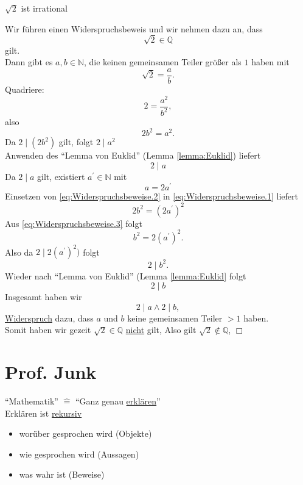\documentclass[a4paper, parskip = true, fleqn, headsepline = true]{scrartcl}
\DeclareRobustCommand{\qed}{%
	\ifmmode \tag*{$\Box$}%
	\else \leavevmode\unskip\penalty9999 \hbox{}\nobreak\hfill\quad\hbox{$\Box$}%
	\fi%
}
\begin{document}
\begin{subtheorem}
	\label{theorem:Sqrt2IstIrrational}
	$ \sqrt{2} $ ist irrational
\end{subtheorem}
\begin{subproof}
	Wir führen einen Widerspruchsbeweis und wir nehmen dazu an, dass
	\[ \sqrt{2} \in \mathbb{Q} \]
	gilt.\\
	Dann gibt es $ a, b \in \mathbb{N} $, die keinen gemeinsamen Teiler größer als $ 1 $ haben mit
	\[ \sqrt{2} = \frac{a}{b}. \]
	Quadriere:
	\[ 2 = \frac{a^2}{b^2}, \]
	also
	\begin{equation}
		\label{eq:Widerspruchsbeweise.1}
		2b^2 = a^2.
	\end{equation}
	Da $ 2 \mid ( 2b^2 ) $ gilt, folgt $ 2 \mid a^2 $\\
	Anwenden des ``Lemma von Euklid'' (Lemma \ref{lemma:Euklid}) liefert
	\[ 2 \mid a \]
	Da $ 2 \mid a $ gilt, existiert $ a^{\prime} \in \mathbb{N} $ mit
	\begin{equation}
		\label{eq:Widerspruchsbeweise.2}
		a = 2 a^{\prime}
	\end{equation}
	Einsetzen von \ref{eq:Widerspruchsbeweise.2} in \ref{eq:Widerspruchsbeweise.1} liefert
	\begin{equation}
		\label{eq:Widerspruchsbeweise.3}
		2b^2 = ( 2a^{\prime} )^2
	\end{equation}
	Aus \ref{eq:Widerspruchsbeweise.3} folgt
	\[ b^2 = 2 ( a^{\prime} )^2. \]
	Also da $ 2 \mid 2 ( a^{\prime} )^2 ) $ folgt
	\[ 2 \mid b^2. \]
	Wieder nach ``Lemma von Euklid'' (Lemma \ref{lemma:Euklid} folgt
	\[ 2 \mid b \]
	Insgesamt haben wir
	\[ 2\mid a \wedge 2 \mid b, \]
	\underline{Widerspruch} dazu, dass $ a $ und $ b $ keine gemeinsamen Teiler $ >1 $ haben.\\
	Somit haben wir gezeit $ \sqrt{2} \in \mathbb{Q} $ \underline{nicht} gilt, Also gilt $ \sqrt{2} \notin \mathbb{Q} $, \qed
\end{subproof}

\section{Prof. Junk}
``Mathematik'' $ \hat= $ ``Ganz genau \underline{erklären}''\\
Erklären ist \underline{rekursiv}
\begin{itemize}
	\item worüber gesprochen wird (Objekte)
	\item wie gesprochen wird (Aussagen)
	\item was wahr ist (Beweise)
\end{itemize}
\end{document}

